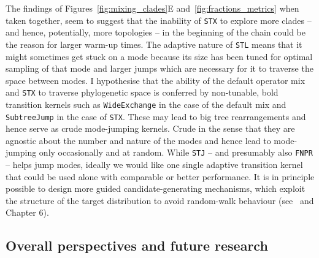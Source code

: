 The findings of Figures~\ref{fig:mixing_clades}E and~\ref{fig:fractions_metrics} when taken together, seem to suggest that the inability of \verb|STX| to explore more clades -- and hence, potentially, more topologies -- in the beginning of the chain could be the reason for larger warm-up times.
The adaptive nature of \verb|STL| means that it might sometimes get stuck on a mode because its size has been tuned for optimal sampling of that mode and larger jumps which are necessary for it to traverse the space between modes.
I hypothesise that the ability of the default operator mix and \verb|STX| to traverse phylogenetic space is conferred by non-tunable, bold transition kernels such as \verb|WideExchange| in the case of the default mix and \verb|SubtreeJump| in the case of \verb|STX|.
These may lead to big tree rearrangements and hence serve as crude mode-jumping kernels.
Crude in the sense that they are agnostic about the number and nature of the modes and hence lead to mode-jumping only occasionally and at random.
While \verb|STJ| -- and presumably also \verb|FNPR| --  helps jump modes, ideally we would like one single adaptive transition kernel that could be used alone with comparable or better performance.
It is in principle possible to design more guided candidate-generating mechanisms, which exploit the structure of the target distribution to avoid random-walk behaviour (see~\cite{Hoehna2012} and Chapter 6).

\subsection{Overall perspectives and future research}
\label{sec:performance_discussion}

